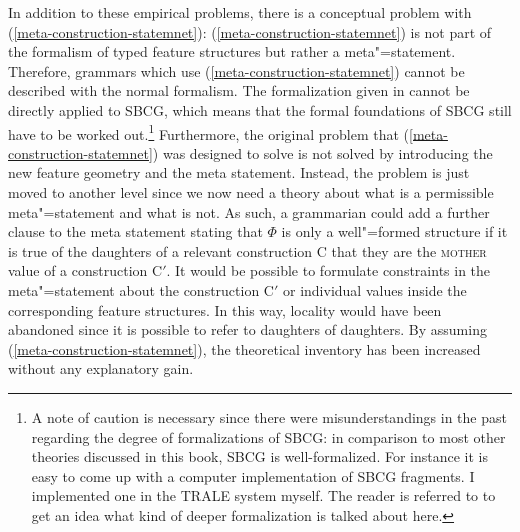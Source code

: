 In addition to these empirical problems, there is a conceptual problem with (\ref{meta-construction-statemnet}):
(\ref{meta-construction-statemnet}) is not part of the formalism of typed feature structures but
rather a meta"=statement.
Therefore,\label{page-sbcg-formalization} grammars which use (\ref{meta-construction-statemnet}) cannot be described with the normal formalism. The formalization given in
\citet{Richter2004a-u} cannot be directly applied to SBCG, which means that the formal foundations
of SBCG still have to be worked out.\footnote{
  A note of caution is necessary since there were misunderstandings in the past regarding the degree
  of formalizations of SBCG: in comparison to most other theories discussed in this book,
  SBCG is well-formalized. For instance it is easy to come up with a computer implementation of SBCG
  fragments. I implemented one in the TRALE system myself. The reader is referred to \citet{Richter2004a-u} to get an idea what kind
  of deeper formalization is talked about here.
}
Furthermore, the original problem that (\ref{meta-construction-statemnet}) was designed to solve is
not solved by introducing the new feature geometry and the meta statement. Instead, the problem
is just moved to another level since we now need a theory about what is a permissible meta"=statement and what is not. As such, a grammarian
could add a further clause to the meta statement stating that $\Phi$ is only a well"=formed structure if it is true of the daughters of a relevant construction C
that they are the \textsc{mother} value of a construction C$'$. It would be possible to formulate constraints in the meta"=statement about the construction C$'$ or individual
values inside the corresponding feature structures.
In this way, locality would have been abandoned since it is possible to refer to daughters of daughters.
By assuming (\ref{meta-construction-statemnet}), the theoretical inventory has been increased without any explanatory gain.

